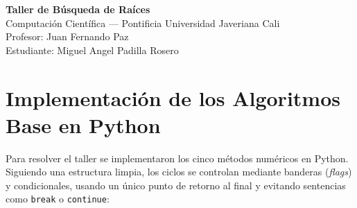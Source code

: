 \documentclass[11pt,a4paper]{article}
\begin{document}
\begin{center}
    {\LARGE\bfseries\color{pujblue} Taller de Búsqueda de Raíces}\\[0.3cm]
    {\large Computación Científica --- Pontificia Universidad Javeriana Cali}\\[0.1cm]
    {\normalsize Profesor: Juan Fernando Paz}\\[0.1cm]
    {\normalsize Estudiante: Miguel Angel Padilla Rosero}
\end{center}
\vspace{0.3cm}

\section{Implementación de los Algoritmos Base en Python}

Para resolver el taller se implementaron los cinco métodos numéricos en Python. Siguiendo una estructura limpia, los ciclos se controlan mediante banderas (\textit{flags}) y condicionales, usando un único punto de retorno al final y evitando sentencias como \texttt{break} o \texttt{continue}:
\end{document}
